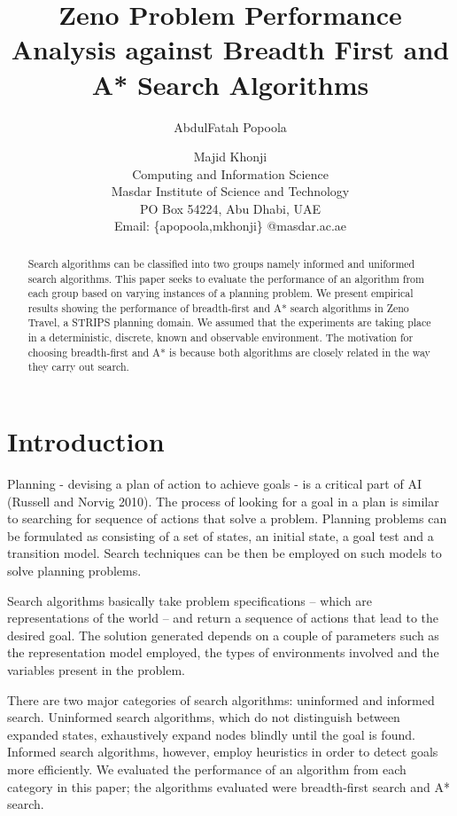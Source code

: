 \documentclass[letterpaper]{article}
\begin{document}
%
\title{Zeno Problem Performance Analysis against Breadth First and A* Search Algorithms}
\author{AbdulFatah Popoola \and
Majid Khonji\\
Computing and Information Science\\
Masdar Institute of Science and Technology\\
PO Box 54224, Abu Dhabi, UAE\\
Email: \{apopoola,mkhonji\} @masdar.ac.ae
}
\maketitle
\begin{abstract}
Search algorithms can be classified into two groups namely informed and uniformed search algorithms.
This paper seeks to evaluate the performance of an algorithm from each group based on varying
instances of a planning problem. We present empirical results showing the performance of breadth-first
and A* search algorithms in Zeno Travel, a STRIPS planning domain. We assumed that the
experiments are taking place in a deterministic, discrete, known and observable environment.
The motivation for choosing breadth-first and A* is because both algorithms are closely related in the way they carry out search.

\end{abstract}


\section{Introduction}
Planning - devising a plan of action to achieve goals - is a critical part of AI (Russell and Norvig 2010).
The process of looking for a goal in a plan is similar to searching for sequence of actions that solve a
problem. Planning problems can be formulated as consisting of a set of
states, an initial state, a goal test and a transition model. Search techniques can be then be employed on such models to solve planning problems.

Search algorithms basically take problem specifications – which are representations of the world – and
return a sequence of actions that lead to the desired goal. The solution generated depends on a couple of
parameters such as the representation model employed, the types of environments involved and the
variables present in the problem.

There are two major categories of search algorithms: uninformed and informed search. Uninformed
search algorithms, which do not distinguish between expanded states, exhaustively expand nodes
blindly until the goal is found. Informed search algorithms, however, employ heuristics in order to
detect goals more efficiently. We evaluated the performance of an algorithm from each category in this
paper; the algorithms evaluated were breadth-first search and A* search.
\end{document}

